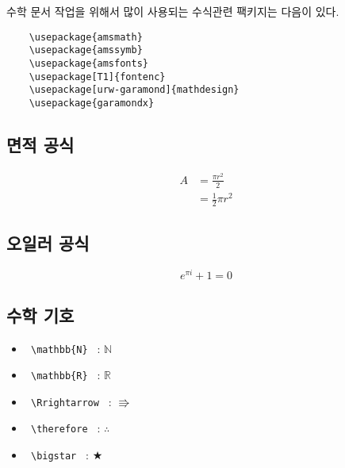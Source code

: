 
수학 문서 작업을 위해서 많이 사용되는 수식관련 팩키지는 다음이 있다.

\begin{verbatim}
	\usepackage{amsmath}
	\usepackage{amssymb}
	\usepackage{amsfonts}
	\usepackage[T1]{fontenc}
	\usepackage[urw-garamond]{mathdesign}
	\usepackage{garamondx}
\end{verbatim}


\subsection{면적 공식}

\begin{equation} \label{eq1}
	\begin{split}
		A & = \frac{\pi r^2}{2} \\
		& = \frac{1}{2} \pi r^2
	\end{split}
\end{equation}


\subsection{오일러 공식}

\begin{equation} \label{eu_eqn}
	e^{\pi i} + 1 = 0
\end{equation}

\subsection{수학 기호}

\begin{itemize}
	
	\item  \verb| \mathbb{N} | : $\mathbb{N}$
	\item  \verb| \mathbb{R} | :  $\mathbb{R}$
	\item  \verb| \Rrightarrow | :  $\Rrightarrow$
	\item  \verb| \therefore | :  $\therefore$
	\item  \verb| \bigstar | :  $\bigstar$ 
	
\end{itemize}

